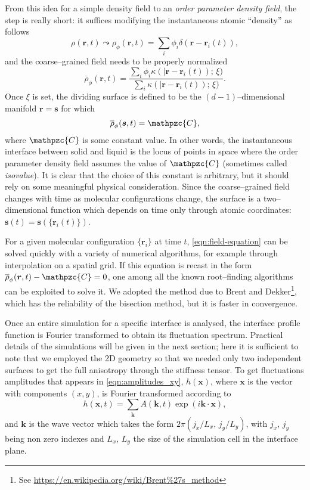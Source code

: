 From this idea for a simple density field to an \textit{order parameter density field}, the step is really short: it suffices modifying the instantaneous atomic ``density'' as follows
\begin{equation}
\label{eqn:op-field1}
    \rho(\bm{r},t) \leadsto \rho_{\phi}(\bm{r},t)=\sum_i \phi_i \delta(\bm{r}-\bm{r}_i(t)),
\end{equation}
and the coarse--grained field needs to be properly normalized
\begin{equation}
\label{eqn:op-field2}
    \overline{\rho}_{\phi}(\bm{r},t)= \frac{\sum_i \phi_i \kappa(\lvert \bm{r}-\bm{r}_i(t));\,\xi)}{\sum_i \kappa(\lvert \bm{r}-\bm{r}_i(t));\,\xi)}.
\end{equation}
Once $\xi$ is set, the dividing surface is defined to be the $(d-1)$--dimensional manifold $\bm{r}=\bm{s}$ for which
\begin{equation}
\label{eqn:field-equation}
     \overline{\rho}_{\phi}(\bm{s},t)=\mathpzc{C},
\end{equation}
where $\mathpzc{C}$ is some constant value. In other words, the instantaneous interface between solid and liquid is the locus of points in space where the order parameter density field assumes the value of $\mathpzc{C}$ (sometimes called \textit{isovalue}). It is clear that the choice of this constant is arbitrary, but it should rely on some meaningful physical consideration. Since the coarse--grained field changes with time as molecular configurations change, the surface is a two--dimensional function which depends on time only through atomic coordinates: $\bm{s}(t)=\bm{s}(\{\bm{r}_i(t)\})$.

For a given molecular configuration $\{\bm{r}_i\}$ at time $t$, \cref{eqn:field-equation} can be solved quickly with a variety of numerical algorithms, for example through interpolation on a spatial grid. If this equation is recast in the form $ \overline{\rho}_{\phi}(\bm{r},t)-\mathpzc{C}=0$, one among all the known root--finding algorithms can be exploited to solve it. We adopted the method due to Brent and Dekker\footnote{See {\ttfamily\url{https://en.wikipedia.org/wiki/Brent\%27s_method}}}, which has the reliability of the bisection method, but it is faster in convergence. 

Once an entire simulation for a specific interface is analysed, the interface profile function is Fourier transformed to obtain its fluctuation spectrum. Practical details of the simulations will be given in the next section; here it is sufficient to note that we employed the 2D geometry so that we needed only two independent surfaces to get the full anisotropy through the stiffness tensor. To get fluctuations amplitudes that appears in \cref{eqn:amplitudes_xy}, $h(\bm{x})$, where $\bm{x}$ is the vector with components $(x,y)$, is Fourier transformed according to
\begin{equation}
\label{eqn:FT}
    h(\bm{x},t)=\sum_{\bm{k}} A(\bm{k},t) \exp{(i\bm{k}\cdot\bm{x})}, 
\end{equation}
and $\bm{k}$ is the wave vector which takes the form $2\pi(j_x/L_x,\,j_y/L_y)$, with $j_x,\,j_y$ being non zero indexes and $L_x,\,L_y$ the size of the simulation cell in the interface plane.

